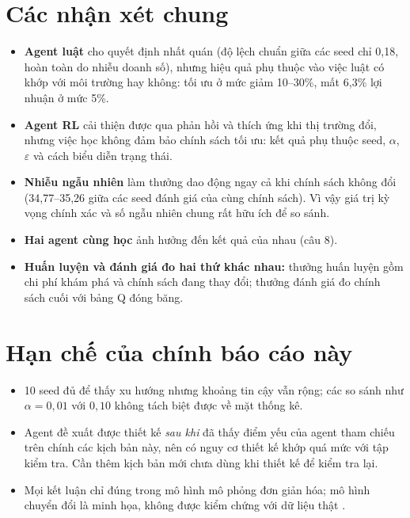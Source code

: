 \documentclass[12pt,a4paper]{report}
\begin{document}
\section{Các nhận xét chung}
\begin{itemize}
\item \textbf{Agent luật} cho quyết định nhất quán (độ lệch chuẩn giữa các seed chỉ
  0{,}18, hoàn toàn do nhiễu doanh số), nhưng hiệu quả phụ thuộc vào việc luật có
  khớp với môi trường hay không: tối ưu ở mức giảm 10--30\%, mất 6{,}3\% lợi nhuận
  ở mức 5\%.
\item \textbf{Agent RL} cải thiện được qua phản hồi và thích ứng khi thị trường đổi,
  nhưng việc học không đảm bảo chính sách tối ưu: kết quả phụ thuộc seed,
  $\alpha$, $\varepsilon$ và cách biểu diễn trạng thái.
\item \textbf{Nhiễu ngẫu nhiên} làm thưởng dao động ngay cả khi chính sách không đổi
  (34{,}77--35{,}26 giữa các seed đánh giá của cùng chính sách). Vì vậy giá trị kỳ
  vọng chính xác và số ngẫu nhiên chung rất hữu ích để so sánh.
\item \textbf{Hai agent cùng học} ảnh hưởng đến kết quả của nhau (câu 8).
\item \textbf{Huấn luyện và đánh giá đo hai thứ khác nhau:} thưởng huấn luyện gồm
  chi phí khám phá và chính sách đang thay đổi; thưởng đánh giá đo chính sách cuối
  với bảng Q đóng băng.
\end{itemize}

\section{Hạn chế của chính báo cáo này}
\begin{itemize}
\item 10 seed đủ để thấy xu hướng nhưng khoảng tin cậy vẫn rộng; các so sánh như
  $\alpha=0{,}01$ với $0{,}10$ không tách biệt được về mặt thống kê.
\item Agent đề xuất được thiết kế \emph{sau khi} đã thấy điểm yếu của agent tham
  chiếu trên chính các kịch bản này, nên có nguy cơ thiết kế khớp quá mức với tập
  kiểm tra. Cần thêm kịch bản mới chưa dùng khi thiết kế để kiểm tra lại.
\item Mọi kết luận chỉ đúng trong mô hình mô phỏng đơn giản hóa; mô hình chuyển đổi
  là minh họa, không được kiểm chứng với dữ liệu thật \cite{complementary}.
\end{itemize}
\end{document}
